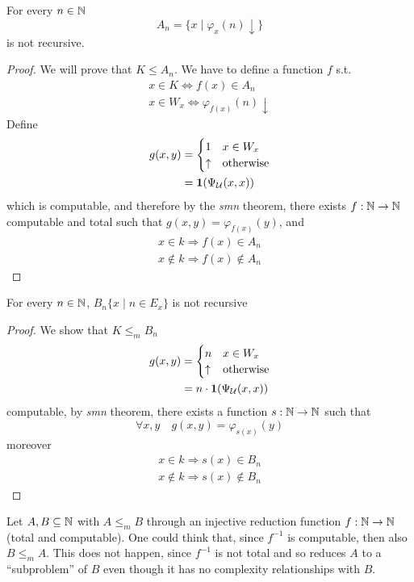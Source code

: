 \begin{example}
  For every $ n \in \mathbb{N}$
  \[
    A_n = \{x  \mid \varphi_x (n) \downarrow\}
  \]
  is not recursive.

  \begin{proof}
    We will prove that $K \leq A_n$. We have to define a function $f$
    s.t.
    \begin{gather*}
      x \in K \Leftrightarrow f(x) \in A_n \\
      x \in W_x \Leftrightarrow \varphi_{f(x)}(n) \downarrow
    \end{gather*}
    Define
    \begin{align*}
      g(x,y) &= \begin{cases}
        1 & x \in W_x \\
        \uparrow & \mbox{otherwise}
      \end{cases} \\
      &= \mathbf{1}(\Psi_{\mathcal{U}}(x,x))
    \end{align*}
    which is computable, and therefore by the \emph{smn} theorem, there exists
    $f: \mathbb{N} \to \mathbb{N}$ computable and total such that
    $g(x,y) = \varphi_{f(x)}(y)$, and
    \begin{gather*}
      x \in k \Rightarrow f(x) \in A_n \\
      x \notin  k \Rightarrow f(x) \notin A_n
    \end{gather*}
  \end{proof}
\end{example}

\begin{example}
  For every $ n \in \mathbb{N}$, $B_n\{ x \mid n \in E_x\}$ is not recursive
  \begin{proof}
    We show that $K \leq_m B_n$
    \[
      \begin{split}
        g(x,y) &= \begin{cases}
          n & x \in W_x \\
          \uparrow & \mbox{otherwise}
        \end{cases} \\
        &= n \cdot \mathbf{1}(\Psi_{\mathcal{U}}(x,x))
      \end{split}
    \]
    computable, by \emph{smn} theorem, there exists a function
    $s : \mathbb{N} \to \mathbb{N}$ such that
    \[
      \forall x,y \quad g(x,y) = \varphi_{s(x)}(y)
    \]
  moreover
  \begin{gather*}
    x \in k \Rightarrow s(x) \in B_n \\
    x \notin k \Rightarrow s(x) \notin B_n
  \end{gather*}
\end{proof}
\end{example}

\begin{observation}
Let $A,B \subseteq \mathbb{N}$ with $A \leq_m B$
through an injective reduction function $f : \mathbb{N} \to \mathbb{N}$ (total and computable). 
One could think that, since $f^{-1}$ is computable, then
also $B \leq_m A$. This does not happen, since $f^{-1}$ is
not total and so reduces $A$ to a ``subproblem'' of $B$ even though
it has no complexity relationships with $B$.
\end{observation}
